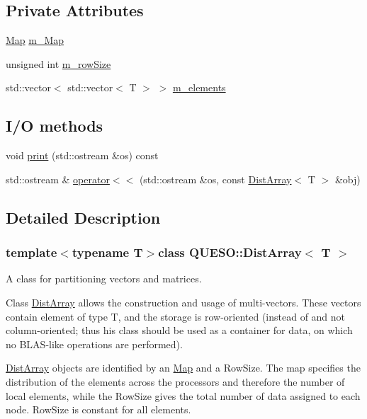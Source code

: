 \subsection*{Private Attributes}
\begin{DoxyCompactItemize}
\item 
\hyperlink{class_q_u_e_s_o_1_1_map}{Map} \hyperlink{class_q_u_e_s_o_1_1_dist_array_aeb1c8299dc302d01ae2fbdafb82b7b37}{m\-\_\-\-Map}
\item 
unsigned int \hyperlink{class_q_u_e_s_o_1_1_dist_array_a663f89dc740471dafcf8b526c255d385}{m\-\_\-row\-Size}
\item 
std\-::vector$<$ std\-::vector$<$ T $>$ $>$ \hyperlink{class_q_u_e_s_o_1_1_dist_array_af1cfbc37cbe9b608d2c2174811e1987c}{m\-\_\-elements}
\end{DoxyCompactItemize}
\subsection*{I/\-O methods}
\begin{DoxyCompactItemize}
\item 
void \hyperlink{class_q_u_e_s_o_1_1_dist_array_ad9d1da6bb1947b03a01cf1fd43bc5780}{print} (std\-::ostream \&os) const 
\item 
std\-::ostream \& \hyperlink{class_q_u_e_s_o_1_1_dist_array_ae1dba6a1558a662e92cb3a823f379fda}{operator$<$$<$} (std\-::ostream \&os, const \hyperlink{class_q_u_e_s_o_1_1_dist_array}{Dist\-Array}$<$ T $>$ \&obj)
\end{DoxyCompactItemize}


\subsection{Detailed Description}
\subsubsection*{template$<$typename T$>$class Q\-U\-E\-S\-O\-::\-Dist\-Array$<$ T $>$}

A class for partitioning vectors and matrices. 

Class \hyperlink{class_q_u_e_s_o_1_1_dist_array}{Dist\-Array} allows the construction and usage of multi-\/vectors. These vectors contain element of type T, and the storage is row-\/oriented (instead of and not column-\/oriented; thus his class should be used as a container for data, on which no B\-L\-A\-S-\/like operations are performed).

\hyperlink{class_q_u_e_s_o_1_1_dist_array}{Dist\-Array} objects are identified by an \hyperlink{class_q_u_e_s_o_1_1_map}{Map} and a Row\-Size. The map specifies the distribution of the elements across the processors and therefore the number of local elements, while the Row\-Size gives the total number of data assigned to each node. Row\-Size is constant for all elements. 

